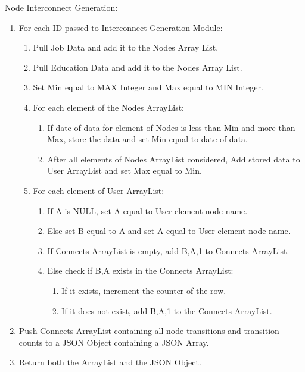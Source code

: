 \begin{description}
    \item[Node Interconnect Generation:]
\end{description}
\begin{enumerate}
  \item For each ID passed to Interconnect Generation Module:
  \begin{enumerate}
    \item Pull Job Data and add it to the Nodes Array List.
    \item Pull Education Data and add it to the Nodes Array List.
    \item Set Min equal to MAX Integer and Max equal to MIN Integer.
    \item For each element of the Nodes ArrayList:
    \begin{enumerate}
      \item If date of data for element of Nodes is less than Min and more than
      Max, store the data and set Min equal to date of data.
      \item After all elements of Nodes ArrayList considered, Add stored data
      to User ArrayList and set Max equal to Min.
  	\end{enumerate}
  	\item For each element of User ArrayList:
  	\begin{enumerate}
  	  \item If A is NULL, set A equal to User element node name.
  	  \item Else set B equal to A and set A equal to User element node name.
  	  \item If Connects ArrayList is empty, add B,A,1 to Connects ArrayList.
  	  \item Else check if B,A exists in the Connects ArrayList:
  	  \begin{enumerate}
  	    \item If it exists, increment the counter of the row.
  	    \item If it does not exist, add B,A,1 to the Connects ArrayList.
  	  \end{enumerate}
  	\end{enumerate}
  \end{enumerate}
  \item Push Connects ArrayList containing all node transitions and transition
  counts to a JSON Object containing a JSON Array.
  \item Return both the ArrayList and the JSON Object.
\end{enumerate}

